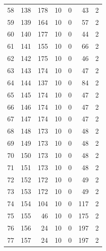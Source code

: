 \documentclass[a4paper,twoside,12pt]{book}
\begin{document}
\begin{appendices}
\begin{table}
\begin{tabular}{lrrrrrr}
		58  &    138 &       178 &        10 &               0 &              43 &         2 \\
		59  &    139 &       164 &        10 &               0 &              57 &         2 \\
		60  &    140 &       177 &        10 &               0 &              44 &         2 \\
		61  &    141 &       155 &        10 &               0 &              66 &         2 \\
		62  &    142 &       175 &        10 &               0 &              46 &         2 \\
		63  &    143 &       174 &        10 &               0 &              47 &         2 \\
		64  &    144 &       137 &        10 &               0 &              84 &         2 \\
		65  &    145 &       174 &        10 &               0 &              47 &         2 \\
		66  &    146 &       174 &        10 &               0 &              47 &         2 \\
		67  &    147 &       174 &        10 &               0 &              47 &         2 \\
		68  &    148 &       173 &        10 &               0 &              48 &         2 \\
		69  &    149 &       173 &        10 &               0 &              48 &         2 \\
		70  &    150 &       173 &        10 &               0 &              48 &         2 \\
		71  &    151 &       173 &        10 &               0 &              48 &         2 \\
		72  &    152 &       172 &        10 &               0 &              49 &         2 \\
		73  &    153 &       172 &        10 &               0 &              49 &         2 \\
		74  &    154 &       104 &        10 &               0 &             117 &         2 \\
		75  &    155 &        46 &        10 &               0 &             175 &         2 \\
		76  &    156 &        24 &        10 &               0 &             197 &         2 \\
		77  &    157 &        24 &        10 &               0 &             197 &         2 \\

\end{tabular}
\end{table}
\end{appendices}
\end{document}
